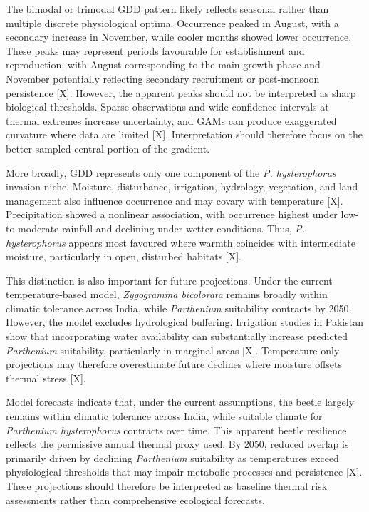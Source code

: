 The bimodal or trimodal GDD pattern likely reflects seasonal rather than multiple discrete physiological optima. Occurrence peaked in August, with a secondary increase in November, while cooler months showed lower occurrence. These peaks may represent periods favourable for establishment and reproduction, with August corresponding to the main growth phase and November potentially reflecting secondary recruitment or post-monsoon persistence [X]. However, the apparent peaks should not be interpreted as sharp biological thresholds. Sparse observations and wide confidence intervals at thermal extremes increase uncertainty, and GAMs can produce exaggerated curvature where data are limited [X]. Interpretation should therefore focus on the better-sampled central portion of the gradient.

More broadly, GDD represents only one component of the \textit{P. hysterophorus} invasion niche. Moisture, disturbance, irrigation, hydrology, vegetation, and land management also influence occurrence and may covary with temperature [X]. Precipitation showed a nonlinear association, with occurrence highest under low-to-moderate rainfall and declining under wetter conditions. Thus, \textit{P. hysterophorus} appears most favoured where warmth coincides with intermediate moisture, particularly in open, disturbed habitats [X].

This distinction is also important for future projections. Under the current temperature-based model, \textit{Zygogramma bicolorata} remains broadly within climatic tolerance across India, while \textit{Parthenium} suitability contracts by 2050. However, the model excludes hydrological buffering. Irrigation studies in Pakistan show that incorporating water availability can substantially increase predicted \textit{Parthenium} suitability, particularly in marginal areas [X]. Temperature-only projections may therefore overestimate future declines where moisture offsets thermal stress [X].

Model forecasts indicate that, under the current assumptions, the beetle largely remains within climatic tolerance across India, while suitable climate for \textit{Parthenium hysterophorus} contracts over time. This apparent beetle resilience reflects the permissive annual thermal proxy used. By 2050, reduced overlap is primarily driven by declining \textit{Parthenium} suitability as temperatures exceed physiological thresholds that may impair metabolic processes and persistence [X]. These projections should therefore be interpreted as baseline thermal risk assessments rather than comprehensive ecological forecasts.

